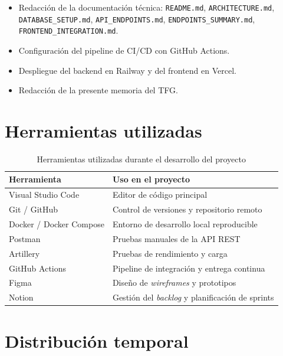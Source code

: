 \documentclass[a4paper]{report}
\begin{document}
\begin{itemize}
  \item Redacción de la documentación técnica: \texttt{README.md}, \texttt{ARCHITECTURE.md}, \texttt{DATABASE\_SETUP.md}, \texttt{API\_ENDPOINTS.md}, \texttt{ENDPOINTS\_SUMMARY.md}, \texttt{FRONTEND\_INTEGRATION.md}.
  \item Configuración del pipeline de CI/CD con GitHub Actions.
  \item Despliegue del backend en Railway y del frontend en Vercel.
  \item Redacción de la presente memoria del TFG.
\end{itemize}

\section{Herramientas utilizadas}

\begin{table}[H]
  \centering
  \begin{tabularx}{\textwidth}{lX}
    \toprule
    \textbf{Herramienta} & \textbf{Uso en el proyecto} \\
    \midrule
    Visual Studio Code    & Editor de código principal \\
    Git / GitHub          & Control de versiones y repositorio remoto \\
    Docker / Docker Compose & Entorno de desarrollo local reproducible \\
    Postman               & Pruebas manuales de la API REST \\
    Artillery             & Pruebas de rendimiento y carga \\
    GitHub Actions        & Pipeline de integración y entrega continua \\
    Figma                 & Diseño de \textit{wireframes} y prototipos \\
    Notion                & Gestión del \textit{backlog} y planificación de sprints \\
    \bottomrule
  \end{tabularx}
  \caption{Herramientas utilizadas durante el desarrollo del proyecto}
\end{table}

\section{Distribución temporal}
\end{document}
